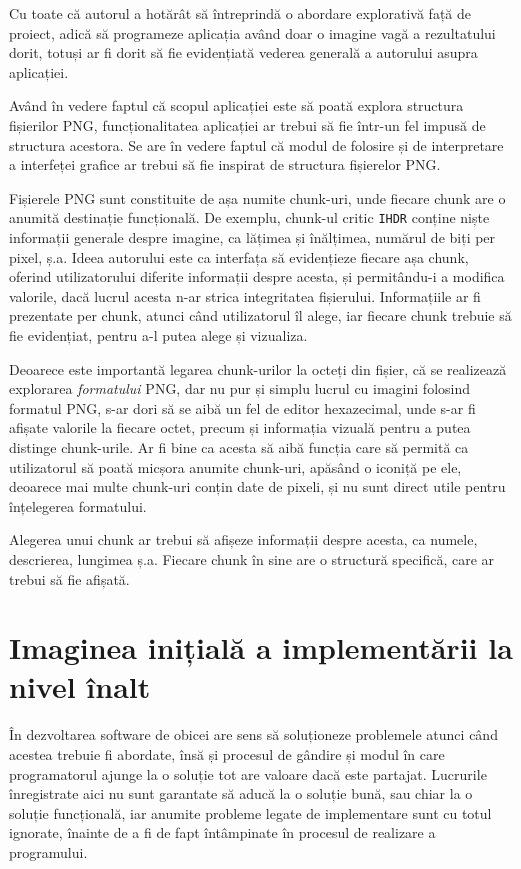 \documentclass[a4paper,12pt]{report}
\begin{document}
Cu toate că autorul a hotărât să întreprindă o abordare explorativă față de proiect,
adică să programeze aplicația având doar o imagine vagă a rezultatului dorit,
totuși ar fi dorit să fie evidențiată vederea generală a autorului asupra aplicației.

Având în vedere faptul că scopul aplicației este să poată explora structura fișierilor PNG,
funcționalitatea aplicației ar trebui să fie într-un fel impusă de structura acestora.
Se are în vedere faptul că modul de folosire și de interpretare a interfeței grafice 
ar trebui să fie inspirat de structura fișierelor PNG.

Fișierele PNG sunt constituite de așa numite chunk-uri,
unde fiecare chunk are o anumită destinație funcțională.
De exemplu, chunk-ul critic \texttt{IHDR} conține niște informații generale despre imagine,
ca lățimea și înălțimea, numărul de biți per pixel, ș.a.
Ideea autorului este ca interfața să evidențieze fiecare așa chunk,
oferind utilizatorului diferite informații despre acesta,
și permitându-i a modifica valorile, dacă lucrul acesta n-ar strica integritatea fișierului.
Informațiile ar fi prezentate per chunk, atunci când utilizatorul îl alege,
iar fiecare chunk trebuie să fie evidențiat, pentru a-l putea alege și vizualiza.

Deoarece este importantă legarea chunk-urilor la octeți din fișier, că se realizează explorarea
\textit{formatului} PNG, dar nu pur și simplu lucrul cu imagini folosind formatul PNG, s-ar dori să se aibă
un fel de editor hexazecimal, unde s-ar fi afișate valorile la fiecare octet,
precum și informația vizuală pentru a putea distinge chunk-urile.
Ar fi bine ca acesta să aibă funcția care să permită ca utilizatorul să poată micșora anumite chunk-uri,
apăsând o iconiță pe ele, deoarece mai multe chunk-uri conțin date de pixeli,
și nu sunt direct utile pentru înțelegerea formatului.

Alegerea unui chunk ar trebui să afișeze informații despre acesta,
ca numele, descrierea, lungimea ș.a.
Fiecare chunk în sine are o structură specifică, care ar trebui să fie afișată.


\section{Imaginea inițială a implementării la nivel înalt}

În dezvoltarea software de obicei are sens să soluționeze
problemele atunci când acestea trebuie fi abordate,
însă și procesul de gândire și modul în care programatorul ajunge la o soluție
tot are valoare dacă este partajat.
Lucrurile înregistrate aici nu sunt garantate să aducă la o soluție bună,
sau chiar la o soluție funcțională, iar anumite probleme legate de implementare
sunt cu totul ignorate, înainte de a fi de fapt întâmpinate în procesul de realizare a programului.
\end{document}

